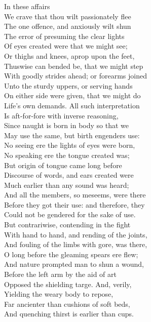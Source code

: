 In these affairs\\
We crave that thou wilt passionately flee\\
The one offence, and anxiously wilt shun\\
The error of presuming the clear lights\\
Of eyes created were that we might see;\\
Or thighs and knees, aprop upon the feet,\\
Thuswise can bended be, that we might step\\
With goodly strides ahead; or forearms joined\\
Unto the sturdy uppers, or serving hands\\
On either side were given, that we might do\\
Life's own demands. All such interpretation\\
Is aft-for-fore with inverse reasoning,\\
Since naught is born in body so that we\\
May use the same, but birth engenders use:\\
No seeing ere the lights of eyes were born,\\
No speaking ere the tongue created was;\\
But origin of tongue came long before\\
Discourse of words, and ears created were\\
Much earlier than any sound was heard;\\
And all the members, so meseems, were there\\
Before they got their use: and therefore, they\\
Could not be gendered for the sake of use.\\
But contrariwise, contending in the fight\\
With hand to hand, and rending of the joints,\\
And fouling of the limbs with gore, was there,\\
O long before the gleaming spears ere flew;\\
And nature prompted man to shun a wound,\\
Before the left arm by the aid of art\\
Opposed the shielding targe. And, verily,\\
Yielding the weary body to repose,\\
Far ancienter than cushions of soft beds,\\
And quenching thirst is earlier than cups.\\
